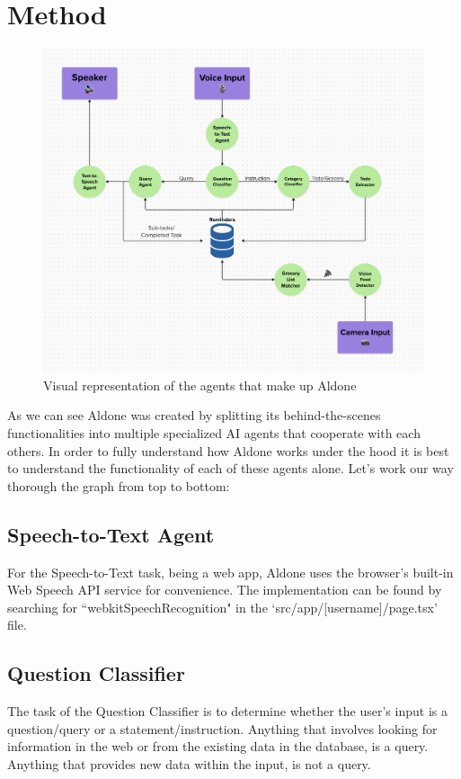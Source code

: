 \documentclass{article}
\begin{document}
\newpage

\section*{\color{draculagreen}Method} 
\begin{figure}[htbp]
\centering
\includegraphics[width=\textwidth]{diagram.png}
\caption{\small Visual representation of the agents that make up Aldone}
\end{figure}

As we can see Aldone was created by splitting its behind-the-scenes functionalities into multiple specialized AI agents that cooperate with each others. In order to fully understand how Aldone works under the hood it is best to understand the functionality of each of these agents alone. Let's work our way thorough the graph from top to bottom:

\subsection*{\color{draculayellow}Speech-to-Text Agent}
For the Speech-to-Text task, being a web app, Aldone uses the browser's built-in Web Speech API service for convenience. The implementation can be found by searching for ``webkitSpeechRecognition" in the `src/app/[username]/page.tsx' file.

\newpage

\subsection*{\color{draculayellow}Question Classifier}
The task of the Question Classifier is to determine whether the user's input is a question/query or a statement/instruction. Anything that involves looking for information in the web or from the existing data in the database, is a query. Anything that provides new data within the input, is not a query.
\end{document}
